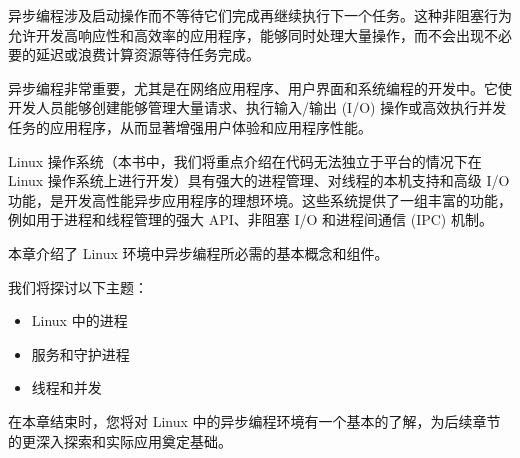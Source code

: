 异步编程涉及启动操作而不等待它们完成再继续执行下一个任务。这种非阻塞行为允许开发高响应性和高效率的应用程序，能够同时处理大量操作，而不会出现不必要的延迟或浪费计算资源等待任务完成。

异步编程非常重要，尤其是在网络应用程序、用户界面和系统编程的开发中。它使开发人员能够创建能够管理大量请求、执行输入/输出 (I/O) 操作或高效执行并发任务的应用程序，从而显著增强用户体验和应用程序性能。

Linux 操作系统（本书中，我们将重点介绍在代码无法独立于平台的情况下在 Linux 操作系统上进行开发）具有强大的进程管理、对线程的本机支持和高级 I/O 功能，是开发高性能异步应用程序的理想环境。这些系统提供了一组丰富的功能，例如用于进程和线程管理的强大 API、非阻塞 I/O 和进程间通信 (IPC) 机制。

本章介绍了 Linux 环境中异步编程所必需的基本概念和组件。

我们将探讨以下主题：

\begin{itemize}
\item
Linux 中的进程

\item
服务和守护进程

\item
线程和并发
\end{itemize}

在本章结束时，您将对 Linux 中的异步编程环境有一个基本的了解，为后续章节的更深入探索和实际应用奠定基础。































